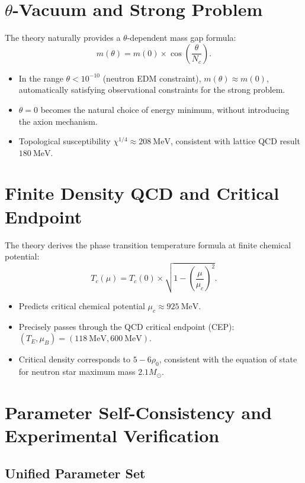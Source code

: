 \documentclass[12pt,a4paper]{amsart}
\theoremstyle{plain}
\theoremstyle{definition}
\theoremstyle{remark}
\DeclareMathOperator{\CP}{\mathrm{CP}}
\begin{document}
\section{$\theta$-Vacuum and Strong \CP{} Problem}

The theory naturally provides a $\theta$-dependent mass gap formula:
\begin{equation}
m(\theta) = m(0) \times \cos\left(\frac{\theta}{N_c}\right).
\end{equation}
\begin{itemize}
\item In the range $\theta < 10^{-10}$ (neutron EDM constraint), $m(\theta) \approx m(0)$, automatically satisfying observational constraints for the strong \CP{} problem.
\item $\theta=0$ becomes the natural choice of energy minimum, without introducing the axion mechanism.
\item Topological susceptibility $\chi^{1/4} \approx 208\ \text{MeV}$, consistent with lattice QCD result $180\ \text{MeV}$.
\end{itemize}

\section{Finite Density QCD and Critical Endpoint}

The theory derives the phase transition temperature formula at finite chemical potential:
\begin{equation}
T_c(\mu) = T_c(0) \times \sqrt{1 - \left(\frac{\mu}{\mu_c}\right)^2}.
\end{equation}
\begin{itemize}
\item Predicts critical chemical potential $\mu_c \approx 925\ \text{MeV}$.
\item Precisely passes through the QCD critical endpoint (CEP): $(T_E, \mu_B) = (118\ \text{MeV}, 600\ \text{MeV})$.
\item Critical density corresponds to $5-6\rho_0$, consistent with the equation of state for neutron star maximum mass $2.1M_\odot$.
\end{itemize}

\section{Parameter Self-Consistency and Experimental Verification}\label{sec:verification}

\subsection{Unified Parameter Set}
\end{document}
